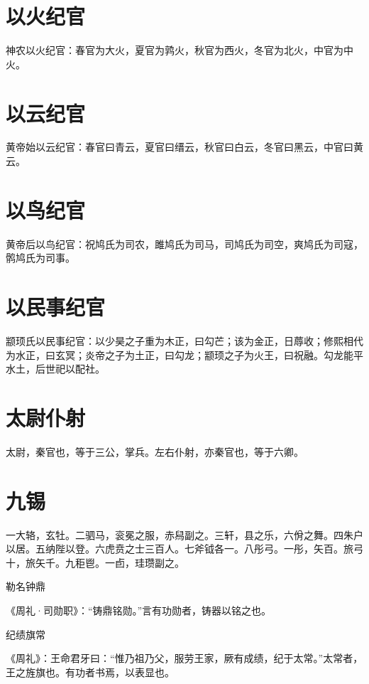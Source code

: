 \documentclass[a4paper,12pt,UTF8,twoside]{ctexbook}
\begin{document}
    \section{以火纪官}
    
    神农以火纪官：春官为大火，夏官为鹑火，秋官为西火，冬官为北火，中官为中火。
    
    \section{以云纪官}
    
    黄帝始以云纪官：春官曰青云，夏官曰缙云，秋官曰白云，冬官曰黑云，中官曰黄云。
    
    \section{以鸟纪官}
    
    黄帝后以鸟纪官：祝鸠氏为司农，雎鸠氏为司马，司鸠氏为司空，爽鸠氏为司寇，鹘鸠氏为司事。
    
    \section{以民事纪官}
    
    颛顼氏以民事纪官：以少昊之子重为木正，曰勾芒；该为金正，日蓐收；修熙相代为水正，曰玄冥；炎帝之子为土正，曰勾龙；颛顼之子为火王，曰祝融。勾龙能平水土，后世祀以配社。
    
    \section{太尉仆射}
    
    太尉，秦官也，等于三公，掌兵。左右仆射，亦秦官也，等于六卿。
    
    \section{九锡}
    
    一大辂，玄牡。二驷马，衮冕之服，赤舄副之。三轩，县之乐，六佾之舞。四朱户以居。五纳陛以登。六虎贲之士三百人。七斧钺各一。八彤弓。一彤，矢百。旅弓十，旅矢千。九秬鬯。一卣，珪瓒副之。
    
    勒名钟鼎
    
    《周礼·司勋职》：“铸鼎铭勋。”言有功勋者，铸器以铭之也。
    
    纪绩旗常
    
    《周礼》：王命君牙曰：“惟乃祖乃父，服劳王家，厥有成绩，纪于太常。”太常者，王之旌旗也。有功者书焉，以表显也。
    
\end{document}
